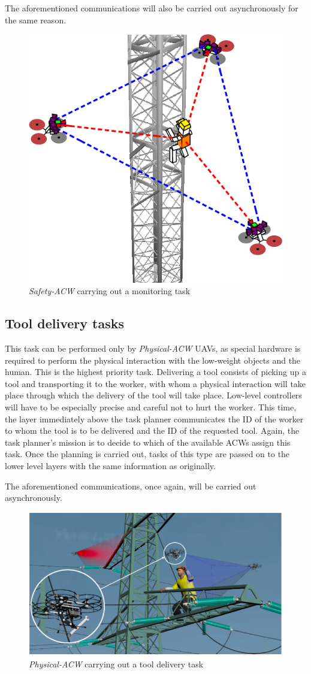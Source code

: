 The aforementioned communications will also be carried out asynchronously for the same reason. 

\begin{figure}[htbp]
    \centering
    \includegraphics[width=0.5\linewidth]
    {ProblemFormulation/figures/monitor_task.pdf}
    \caption{\textit{Safety-ACW} carrying out a monitoring task}
    \label{fig:monitor_task}
\end{figure}

\subsection{Tool delivery tasks}
\label{subsec:ToolDeliveryTasks}
This task can be performed only by \textit{Physical-ACW} \glspl{UAV}, as special hardware is required to perform the physical interaction with the low-weight objects and the human. This is the highest priority task. Delivering a tool consists of picking up a tool and transporting it to the worker, with whom a physical interaction will take place through which the delivery of the tool will take place. Low-level controllers will have to be especially precise and careful not to hurt the worker. This time, the layer immediately above the task planner communicates the \gls{ID} of the worker to whom the tool is to be delivered and the \gls{ID} of the requested tool. Again, the task planner's mission is to decide to which of the available \glspl{ACW} assign this task. Once the planning is carried out, tasks of this type are passed on to the lower level layers with the same information as originally.

The aforementioned communications, once again, will be carried out asynchronously. 


\begin{figure}[htbp]
    \centering
    \includegraphics[width=0.7\linewidth]
    {ProblemFormulation/figures/deliver_task.png}
    \caption{\textit{Physical-ACW} carrying out a tool delivery task}
    \label{fig:deliver_task}
\end{figure}

